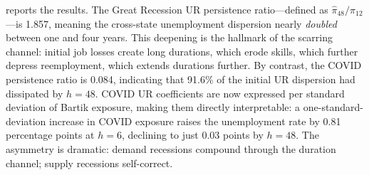 \documentclass[12pt]{article}
\begin{document}
 reports the results. The Great Recession UR persistence ratio---defined as $\hat{\pi}_{48}/\hat{\pi}_{12}$---is 1.857, meaning the cross-state unemployment dispersion nearly \textit{doubled} between one and four years. This deepening is the hallmark of the scarring channel: initial job losses create long durations, which erode skills, which further depress reemployment, which extends durations further. By contrast, the COVID persistence ratio is 0.084, indicating that 91.6\% of the initial UR dispersion had dissipated by $h = 48$. COVID UR coefficients are now expressed per standard deviation of Bartik exposure, making them directly interpretable: a one-standard-deviation increase in COVID exposure raises the unemployment rate by 0.81 percentage points at $h = 6$, declining to just 0.03 points by $h = 48$. The asymmetry is dramatic: demand recessions compound through the duration channel; supply recessions self-correct.
\end{document}
